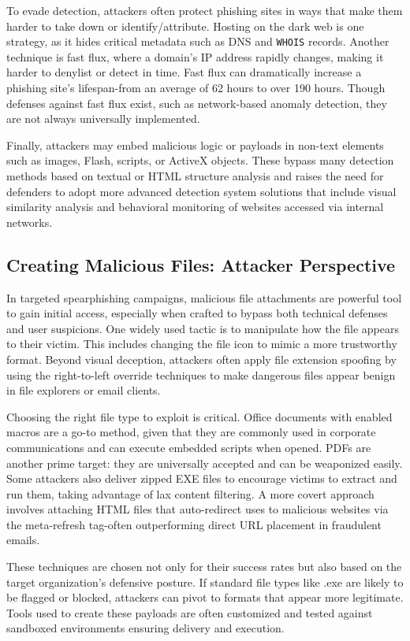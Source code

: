 To evade detection, attackers often protect phishing sites in ways that make them harder to take down or identify/attribute. Hosting on the dark web is one strategy, as it hides critical metadata such as DNS and \texttt{WHOIS} records. Another technique is fast flux, where a domain's IP address rapidly changes, making it harder to denylist or detect in time. Fast flux can dramatically increase a phishing site's lifespan-from an average of 62 hours to over 190 hours. Though defenses against fast flux exist, such as network-based anomaly detection, they are not always universally implemented.

Finally, attackers may embed malicious logic or payloads in non-text elements such as images, Flash, scripts, or ActiveX objects. These bypass many detection methods based on textual or HTML structure analysis and raises the need for defenders to adopt more advanced detection system solutions that include visual similarity analysis and behavioral monitoring of websites accessed via internal networks.

\subsection{Creating Malicious Files: Attacker Perspective}
In targeted spearphishing campaigns, malicious file attachments are powerful tool to gain initial access, especially when crafted to bypass both technical defenses and user suspicions. One widely used tactic is to manipulate how the file appears to their victim. This includes changing the file icon to mimic a more trustworthy format. Beyond visual deception, attackers often apply file extension spoofing by using the right-to-left override techniques to make dangerous files appear benign in file explorers or email clients.

Choosing the right file type to exploit is critical. Office documents with enabled macros are a go-to method, given that they are commonly used in corporate communications and can execute embedded scripts when opened. PDFs are another prime target: they are universally accepted and can be weaponized easily. Some attackers also deliver zipped EXE files to encourage victims to extract and run them, taking advantage of lax content filtering. A more covert approach involves attaching HTML files that auto-redirect uses to malicious websites via the meta-refresh tag-often outperforming direct URL placement in fraudulent emails.

These techniques are chosen not only for their success rates but also based on the target organization's defensive posture. If standard file types like .exe are likely to be flagged or blocked, attackers can pivot to formats that appear more legitimate. Tools used to create these payloads are often customized and tested against sandboxed environments ensuring delivery and execution.

